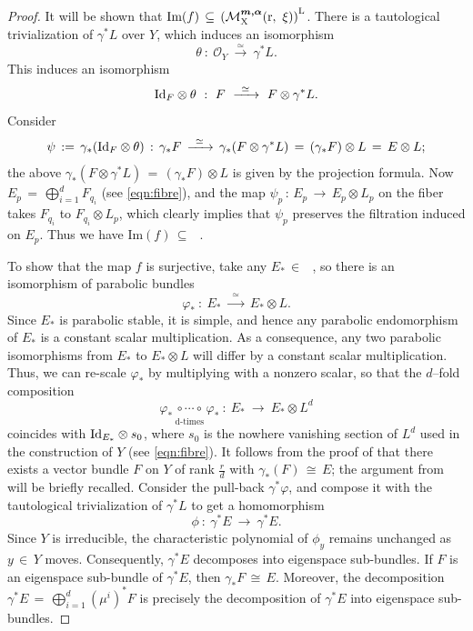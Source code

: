 \documentclass[10pt,reqno]{amsart}
\DeclareMathOperator{\MLalpha}{\left(\mc{M}^{\boldsymbol{m,\alpha}}_X(r,\ \xi)\right)^L}
\newcommand{\mc}[1]{\mathcal{#1}}
\theoremstyle{myroman}
\numberwithin{equation}{section}
\begin{document}
\begin{proof}
			It will be shown that $\textnormal{Im}(f)\,\subseteq\,\MLalpha$. There is a tautological 
			trivialization of $\gamma^*L$ over $Y$, which induces an isomorphism 
			\begin{equation}\label{tautological trivialization}
				\theta\ :\ \mathcal{O}_{Y}\ \overset{\simeq}{\longrightarrow}\ \gamma^*L.
			\end{equation}  
			This induces an isomorphism
			\begin{equation*}
				{\rm Id}_F\otimes \theta \ :\ F\ \xrightarrow{\,\,\,\simeq\,\,\,}\ F\otimes \gamma^*L.
			\end{equation*}
			Consider
			$$
			\psi\, :=\, \gamma_*({\rm Id}_F\otimes\theta)\, :\, \gamma_*F \, \xrightarrow{\,\,\,\simeq\,\,\,}\,
			\gamma_*(F\otimes \gamma^*L)\,=\, (\gamma_*F)\otimes L\,=\, E\otimes L;
			$$
			the above $\gamma_*(F\otimes \gamma^*L)\,=\, (\gamma_*F)\otimes L$ is given by the projection formula.
			Now $E_p\,=\, \bigoplus_{i=1}^{d}F_{q_i}$ (see \eqref{eqn:fibre}), and the map $\psi_p\,:\,E_p
			\,\longrightarrow\, E_p\otimes L_p$ on the fiber takes $F_{q_i}$ to $F_{q_i}\otimes L_p$, which clearly implies that
			$\psi_p$ preserves the filtration induced on $E_p$. Thus we have $\text{Im}(f)\,\subseteq\, \MLalpha.$
			
			To show that the map $f$ is surjective, take any $E_*\,\in\, \MLalpha$, so there is an isomorphism
			of parabolic bundles 
			\[\varphi_*\ :\ E_*\ \xrightarrow{\,\,\,\simeq\,\,\,}\ E_*\otimes L.\] 
			Since $E_*$ is parabolic stable, it is simple, and hence any parabolic endomorphism of $E_*$ is 
			a constant scalar multiplication. As a consequence, any two parabolic isomorphisms from 
			$E_*$ to $E_*\otimes L$ will differ by a constant scalar multiplication. Thus, we can re-scale $\varphi_*$ 
			by multiplying with a nonzero scalar, so that the $d$--fold composition
			\[\underset{\text{d-times}}{\varphi_*\,\circ\cdots\circ\,\varphi_*}\ :\ E_*
			\ \longrightarrow\ E_*\otimes L^d\]
			coincides with $\textnormal{Id}_{E_*}\otimes s_0$, where $s_0$ is the
			nowhere vanishing section of $L^d$ used in the construction of $Y$ (see
			\eqref{eqn:fibre}).
			It follows from the proof of \cite[Lemma 2.1]{BH10} that there exists a vector bundle $F$ on $Y$ of rank
			$\frac{r}{d}$ with $\gamma_*(F)\,\cong\, E$; the argument from \cite{BH10} will be briefly
			recalled. Consider the pull-back $\gamma^*\varphi$, and compose it with the tautological trivialization of
			$\gamma^*L$ to get a homomorphism 
			\[\phi\ :\ \gamma^*E\ \longrightarrow\ \gamma^*E.\] 
			Since $Y$ is irreducible, the characteristic polynomial of $\phi_y$ remains unchanged as
			$y\,\in \,Y$ moves. Consequently, $\gamma^*E$ decomposes into eigenspace
			sub-bundles. If $F$ is an eigenspace sub-bundle of $\gamma^*E$, then
			$\gamma_* F\,\cong\, E$. Moreover, the decomposition $\gamma^* E\,=\,\bigoplus_{i=1}^{d}(\mu^i)^*F$ is precisely
			the decomposition of $\gamma^* E$ into eigenspace sub-bundles.
			

\end{proof}
\end{document}
